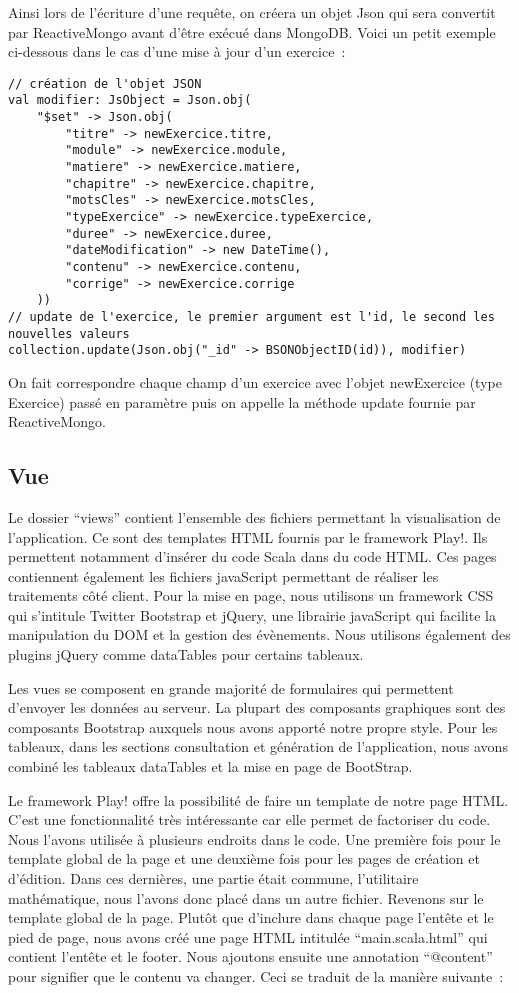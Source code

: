 Ainsi lors de l'écriture d'une requête, on créera un objet Json qui sera convertit par ReactiveMongo avant d'être exécué dans MongoDB. Voici un petit exemple ci-dessous dans le cas d'une mise à jour d'un exercice~:

\begin{lstlisting}
// création de l'objet JSON
val modifier: JsObject = Json.obj(
 	"$set" -> Json.obj(
		"titre" -> newExercice.titre,
		"module" -> newExercice.module,
		"matiere" -> newExercice.matiere,
		"chapitre" -> newExercice.chapitre,
		"motsCles" -> newExercice.motsCles,
		"typeExercice" -> newExercice.typeExercice,
		"duree" -> newExercice.duree,
		"dateModification" -> new DateTime(),
		"contenu" -> newExercice.contenu,
		"corrige" -> newExercice.corrige
 	))
// update de l'exercice, le premier argument est l'id, le second les nouvelles valeurs 
collection.update(Json.obj("_id" -> BSONObjectID(id)), modifier) 	
\end{lstlisting} 

On fait correspondre chaque champ d'un exercice avec l'objet newExercice (type Exercice) passé en paramètre puis on appelle la méthode update fournie par ReactiveMongo. 

\subsection{Vue}

Le dossier \enquote{views} contient l'ensemble des fichiers permettant la visualisation de l'application. Ce sont des templates HTML fournis par le framework Play!. Ils permettent notamment d'insérer du code Scala dans du code HTML. Ces pages contiennent également les fichiers javaScript permettant de réaliser les traitements côté client. Pour la mise en page, nous utilisons un framework CSS qui s'intitule Twitter Bootstrap et jQuery, une librairie javaScript qui facilite la manipulation du DOM et la gestion des évènements. Nous utilisons également des plugins jQuery comme dataTables pour certains tableaux.

Les vues se composent en grande majorité de formulaires qui permettent d'envoyer les données au serveur. La plupart des composants graphiques sont des composants Bootstrap auxquels nous avons apporté notre propre style. Pour les tableaux, dans les sections consultation et génération de l'application, nous avons combiné les tableaux dataTables et la mise en page de BootStrap. 

Le framework Play! offre la possibilité de faire un template de notre page HTML. C'est une fonctionnalité très intéressante car elle permet de factoriser du code. Nous l'avons utilisée à plusieurs endroits dans le code. Une première fois pour le template global de la page et une deuxième fois pour les pages de création et d'édition. Dans ces dernières, une partie était commune, l'utilitaire mathématique, nous l'avons donc placé dans un autre fichier. Revenons sur le template global de la page. Plutôt que d'inclure dans chaque page l'entête et le pied de page, nous avons créé une page HTML intitulée \enquote{main.scala.html} qui contient l'entête et le footer. Nous ajoutons ensuite une annotation \enquote{@content} pour signifier que le contenu va changer. Ceci se traduit de la manière suivante~:

